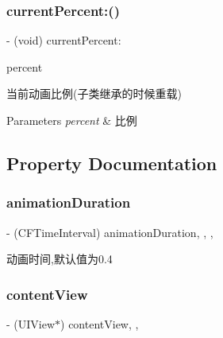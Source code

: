 \subsubsection{\texorpdfstring{current\+Percent\+:()}{currentPercent:()}}
{\footnotesize\ttfamily -\/ (void) current\+Percent\+: \begin{DoxyParamCaption}\item[{(C\+G\+Float)}]{percent }\end{DoxyParamCaption}}

当前动画比例(子类继承的时候重载)


\begin{DoxyParams}{Parameters}
{\em percent} & 比例 \\
\hline
\end{DoxyParams}


\subsection{Property Documentation}
\mbox{\label{interface_p_o_p_base_control_aee9d1d4e75a50d9298601871373136cf}} 
\subsubsection{\texorpdfstring{animation\+Duration}{animationDuration}}
{\footnotesize\ttfamily -\/ (C\+F\+Time\+Interval) animation\+Duration\hspace{0.3cm}{\ttfamily [read]}, {\ttfamily [write]}, {\ttfamily [nonatomic]}, {\ttfamily [assign]}}

动画时间,默认值为0.4 \mbox{\label{interface_p_o_p_base_control_a9435811830054abb95e90d21766003f7}} 
\subsubsection{\texorpdfstring{content\+View}{contentView}}
{\footnotesize\ttfamily -\/ (U\+I\+View$\ast$) content\+View\hspace{0.3cm}{\ttfamily [read]}, {\ttfamily [nonatomic]}, {\ttfamily [strong]}}

